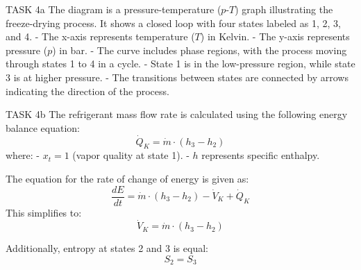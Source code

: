 TASK 4a  
The diagram is a pressure-temperature (\(p\)-\(T\)) graph illustrating the freeze-drying process. It shows a closed loop with four states labeled as 1, 2, 3, and 4.  
- The x-axis represents temperature (\(T\)) in Kelvin.  
- The y-axis represents pressure (\(p\)) in bar.  
- The curve includes phase regions, with the process moving through states 1 to 4 in a cycle.  
- State 1 is in the low-pressure region, while state 3 is at higher pressure.  
- The transitions between states are connected by arrows indicating the direction of the process.  

TASK 4b  
The refrigerant mass flow rate is calculated using the following energy balance equation:  
\[
\dot{Q}_K = \dot{m} \cdot (h_3 - h_2)
\]  
where:  
- \(x_t = 1\) (vapor quality at state 1).  
- \(h\) represents specific enthalpy.  

The equation for the rate of change of energy is given as:  
\[
\frac{dE}{dt} = \dot{m} \cdot (h_3 - h_2) - \dot{V}_K + \dot{Q}_K
\]  
This simplifies to:  
\[
\dot{V}_K = \dot{m} \cdot (h_3 - h_2)
\]  

Additionally, entropy at states 2 and 3 is equal:  
\[
S_2 = S_3
\]  